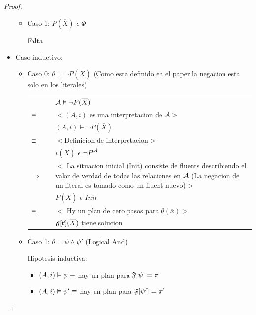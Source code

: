 \begin{proof}
\begin{itemize}
\begin{itemize}
					
				\item Caso 1: $P(\overline{X})$ $\epsilon$ $\Phi$
				
					  Falta
			\end{itemize}
			
		\item Caso inductivo:
			\begin{itemize}
				\item Caso 0: $\theta = \neg P(\overline{X})$ (Como esta definido en el paper la negacion esta solo en los literales)
				
				\begin{tabular}{@{}p{1mm}p{1mm}p{11cm}}	
						& & $\mathcal{A} \vDash \neg P(\overline{X})$\\
						$\equiv$ & & $<(A,i)$ es una interpretacion de $\mathcal{A}>$ \\
						& & $(A,i) \models \neg P(\overline{X})$ \\
						$\equiv$ & & $<$Definicion de interpretacion$>$\\
						& & $i(\overline{X})$ $\epsilon$ ${\neg P}^{\mathcal{A}}$\\
						$\Rightarrow$ & & $<$ La situacion inicial (Init) consiste de fluents describiendo el valor de 
									  verdad de todas las relaciones en $\mathcal{A}$ (La negacion de un literal es tomado como
									  un fluent nuevo)$>$\\
						& & $P(\overline{X})$ $\epsilon$ $Init$ \\ 
						$\equiv$ & & $<$ Hy un plan de cero pasos para $\theta(\overline{x})>$\\
						& & $\mathfrak{F}[\theta](\overline{X})$ tiene solucion
				\end{tabular}
					
				\item Caso 1: $\theta = \psi \land \psi'$ (Logical And)
					  
					  Hipotesis inductiva:
					 	\begin{itemize}
					 		\item $(A,i) \vDash \psi \equiv$ hay un plan para $\mathfrak{F}[\psi] = \pi$
							\item $(A,i) \vDash \psi' \equiv$ hay un plan para $\mathfrak{F}[\psi'] = \pi'$
					 	\end{itemize}
				

\end{itemize}
\end{itemize}
\end{proof}
